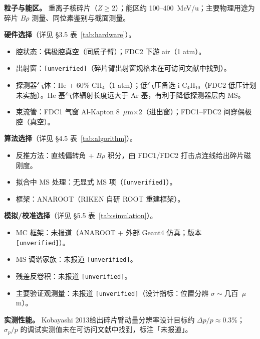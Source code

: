 \documentclass[a4paper, 11pt]{article}
\begin{document}
\textbf{粒子与能区。}
重离子核碎片（$Z \geq 2$）；能区约 100--400~MeV/u；主要物理用途为碎片 $B\rho$ 测量、同位素鉴别与截面测量。

\textbf{硬件选择}（详见 §3.5 表~\ref{tab:hardware}）。
\begin{itemize}[leftmargin=2em,itemsep=0pt]
\item 腔状态：偶极腔真空（同质子臂）；FDC2 下游 air（1 atm）。
\item 出射窗：\texttt{[unverified]}（碎片臂出射窗规格未在可访问文献中找到）。
\item 探测器气体：He + 60\% CH$_4$（1 atm）；低气压备选 i-C$_4$H$_{10}$（FDC2 低压计划未实施）。He 基气体辐射长度远大于 Ar 基，有利于降低探测器层内 MS。
\item 束流管：FDC1 气窗 Al-Kapton 8~$\mu$m$\times 2$（进出窗）；FDC1--FDC2 间穿偶极腔（真空）。
\end{itemize}

\textbf{算法选择}（详见 §4.5 表~\ref{tab:algorithm}）。
\begin{itemize}[leftmargin=2em,itemsep=0pt]
\item 反推方法：直线偏转角 + $B\rho$ 积分，由 FDC1/FDC2 打击点连线给出碎片磁刚度。
\item 拟合中 MS 处理：无显式 MS 项（\texttt{[unverified]}）。
\item 框架：ANAROOT（RIKEN 自研 ROOT 重建框架）。
\end{itemize}

\textbf{模拟/校准选择}（详见 §5.5 表~\ref{tab:simulation}）。
\begin{itemize}[leftmargin=2em,itemsep=0pt]
\item MC 框架：未报道（ANAROOT + 外部 Geant4 仿真；版本 \texttt{[unverified]}）。
\item MS 调谐家族：未报道 \texttt{[unverified]}。
\item 残差反卷积：未报道 \texttt{[unverified]}。
\item 主要验证观测量：未报道 \texttt{[unverified]}（设计指标：位置分辨 $\sigma \sim$几百~$\mu$m）。
\end{itemize}

\textbf{实测性能。}
Kobayashi 2013给出碎片臂动量分辨率设计目标约 $\Delta p/p \approx 0.3\%$；$\sigma_p/p$ 的调试实测值未在可访问文献中找到，标注「未报道」。
\end{document}
